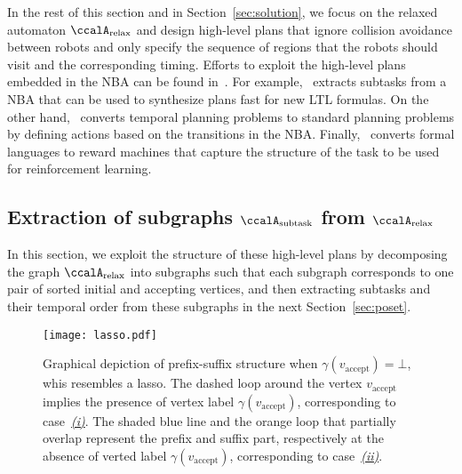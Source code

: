 \documentclass[journal]{IEEEtran}
\newcommand{\auto}[1]{\ccalA_{\text{#1}}}
\begin{document}
{{In the rest of this section and in Section~\ref{sec:solution}, we focus on the relaxed automaton $\auto{relax}$ and design high-level plans that ignore collision avoidance between robots and only specify the sequence of regions that the robots should visit and the corresponding timing.} Efforts to exploit the high-level plans embedded in the NBA can be found in~\cite{xluo_CDC19,camacho2017non,camacho2019ltl}. For example,~\cite{xluo_CDC19} extracts subtasks from a NBA that can be used to synthesize plans fast for new LTL formulas. On the other hand,~\cite{camacho2017non} converts temporal planning problems to standard planning problems by defining actions based on the transitions in the NBA. Finally,~\cite{camacho2019ltl} converts formal languages to reward machines that capture the structure of the task to be used for reinforcement learning.


  \subsection{Extraction of subgraphs $\auto{subtask}$ from $\auto{relax}$}\label{sec:pregraph}
  In  this section, we exploit the structure of these high-level plans by decomposing the graph $\auto{relax}$ into subgraphs such that each subgraph corresponds to one pair of sorted initial and accepting vertices,  and then extracting subtasks and their temporal order  from these subgraphs in the next Section~\ref{sec:poset}.



\begin{figure}[!t]
  \centering
   \texttt{[image: lasso.pdf]}
  \caption{Graphical depiction of prefix-suffix structure when $\gamma(v_{\text{accept}})=\bot$, whis resembles a lasso. The dashed loop around the vertex $v_{\text{accept}}$ implies the presence of vertex label $\gamma(v_{\text{accept}})$, corresponding to case~\hyperref[sec:presence]{{\it (i)}}. The shaded blue line and the orange loop that partially overlap represent the prefix and suffix part, respectively at the absence of verted label $\gamma(v_{\text{accept}})$, corresponding to case~\hyperref[sec:absence]{{\it (ii)}}.}
  \label{fig:lasso}
\end{figure}

}
\end{document}
